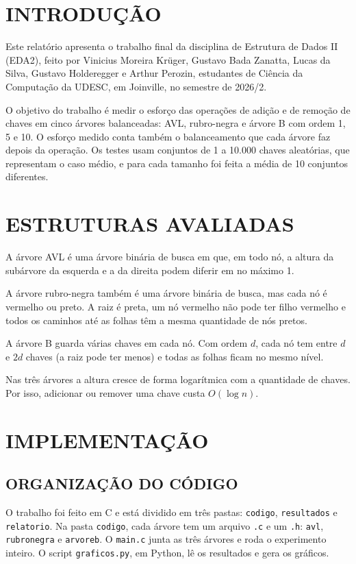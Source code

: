 \section{INTRODUÇÃO}

Este relatório apresenta o trabalho final da disciplina de Estrutura de Dados II (EDA2), feito por Vinicius Moreira Krüger, Gustavo Bada Zanatta, Lucas da Silva, Gustavo Holderegger e Arthur Perozin, estudantes de Ciência da Computação da UDESC, em Joinville, no semestre de 2026/2.

O objetivo do trabalho é medir o esforço das operações de adição e de remoção de chaves em cinco árvores balanceadas: AVL, rubro-negra e árvore B com ordem 1, 5 e 10. O esforço medido conta também o balanceamento que cada árvore faz depois da operação. Os testes usam conjuntos de 1 a 10.000 chaves aleatórias, que representam o caso médio, e para cada tamanho foi feita a média de 10 conjuntos diferentes.

\section{ESTRUTURAS AVALIADAS}

A árvore AVL é uma árvore binária de busca em que, em todo nó, a altura da subárvore da esquerda e a da direita podem diferir em no máximo 1.

A árvore rubro-negra também é uma árvore binária de busca, mas cada nó é vermelho ou preto. A raiz é preta, um nó vermelho não pode ter filho vermelho e todos os caminhos até as folhas têm a mesma quantidade de nós pretos.

A árvore B guarda várias chaves em cada nó. Com ordem $d$, cada nó tem entre $d$ e $2d$ chaves (a raiz pode ter menos) e todas as folhas ficam no mesmo nível.

Nas três árvores a altura cresce de forma logarítmica com a quantidade de chaves. Por isso, adicionar ou remover uma chave custa $O(\log n)$.

\section{IMPLEMENTAÇÃO}

\subsection{ORGANIZAÇÃO DO CÓDIGO}

O trabalho foi feito em C e está dividido em três pastas: \texttt{codigo}, \texttt{resultados} e \texttt{relatorio}. Na pasta \texttt{codigo}, cada árvore tem um arquivo \texttt{.c} e um \texttt{.h}: \texttt{avl}, \texttt{rubronegra} e \texttt{arvoreb}. O \texttt{main.c} junta as três árvores e roda o experimento inteiro. O script \texttt{graficos.py}, em Python, lê os resultados e gera os gráficos.

